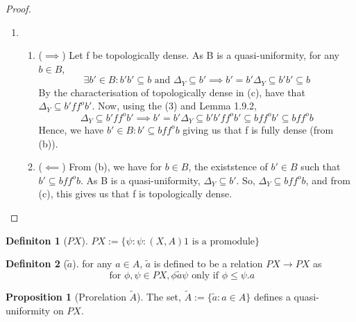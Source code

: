 \documentclass[18pt,a4paper]{article}
\makeatletter
\theoremstyle{definition}
\newtheorem{definition}{Definiton}[section]
\newtheorem{proop}{Proposition}[section]
\newcommand{\carrow}{}%
\DeclareRobustCommand{\carrow}{%
	\mathrel{\vphantom{\rightarrow}\mathpalette\circle@arrow\relax}%
}
\newcommand{\circle@arrow}[2]{%
	\m@th
	\ooalign{%
		\hidewidth$#1\circ\mkern1mu$\hidewidth\cr
	$#1\longrightarrow$\cr}%
}
\makeatother
\begin{document}
\begin{proof}
\begin{enumerate}[label=(\alph*)]
	\item
		\begin{enumerate}[label=(\roman*)]
			\item
				($\implies $) Let f be topologically dense. As B is a quasi-uniformity, for any $b \in B$,
				\begin{equation}\exists b' \in B : b'b' \subseteq b \text{ and } \Delta_Y \subseteq b'
					\implies b'=b'\Delta_Y \subseteq b'b' \subseteq b
				\end{equation}
				By the characterisation of topologically dense in (c), have that $\Delta_Y \subseteq b'f f^o b'$.
				Now, using the (3) and Lemma 1.9.2,
				\[ \Delta_Y \subseteq b'f f^o b' \implies b'=b'\Delta_Y \subseteq b'b'f f^o b' \subseteq bf f^o b'
				\subseteq bf f^o b\]
				Hence, we have $b'\in B : b' \subseteq bf f^o b$ giving us that f is fully dense (from (b)).
			\item ($\impliedby$) From (b), we have for $b \in B$, the existstence of $b' \in B$ such that $
				b' \subseteq bf f^o b$. As B is a quasi-uniformity, $\Delta_Y \subseteq b'$. So,
				$\Delta_Y \subseteq bf f^o b$, and from (c), this gives us that f is topologically dense.
		\end{enumerate}
\end{enumerate}
\end{proof}
\begin{definition}[$PX$] %
	$PX:=\{\psi : \psi:(X,A) \carrow 1 \text{ is a promodule} \}$
\end{definition}
\begin{definition}[$\tilde{a}$] %
	for any $a\in A$, $\tilde{a}$ is defined to be a relation $PX \to PX$ as
	\[ \text{ for } \phi,\psi \in PX, \phi \tilde{a} \psi \text{ only if } \phi \leq \psi.a \]
\end{definition}
\begin{proop}[Prorelation $\tilde{A}$] %
	The set, $\tilde{A}:=\{\tilde{a}:a \in A\}$ defines a quasi-uniformity on $PX$.
\end{proop}
\end{document}

